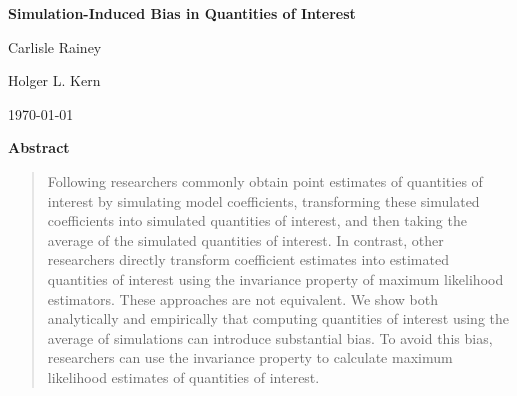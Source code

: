 \documentclass[11pt]{article}
\begin{document}
\begin{center}

{\Large \textbf{Simulation-Induced Bias in Quantities of Interest}}

\vspace{1cm}

Carlisle Rainey

\vspace{2mm}

Holger L. Kern

\vspace{1cm}

\today
\end{center}

\vspace{5mm}

{\centerline{\textbf{Abstract}}}
\begin{quote}\noindent
Following \cite{KingTomzWittenberg2000} researchers commonly obtain point estimates of quantities of interest by simulating model coefficients, transforming these simulated coefficients into simulated quantities of interest, and then taking the average of the simulated quantities of interest. In contrast, other researchers directly transform coefficient estimates into estimated quantities of interest using the invariance property of maximum likelihood estimators. These approaches are not equivalent. We show both analytically and empirically that computing quantities of interest using the average of simulations can introduce substantial bias. To avoid this bias, researchers can use the invariance property to calculate maximum likelihood estimates of quantities of interest.\\
\end{quote}
\end{document}
